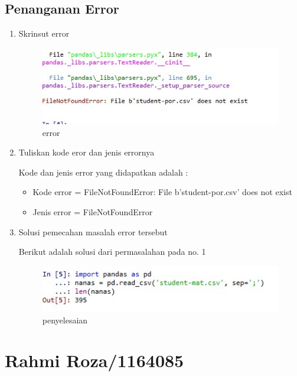 \subsection{Penanganan Error}
\begin{enumerate}
\item Skrinsut error
\begin{figure}
\centering
\includegraphics[scale=0.5]{figures/h1.jpg}
\caption{error}
\label{contoh}
\end{figure}

\item Tuliskan kode eror dan jenis errornya
\par Kode dan jenis error yang didapatkan adalah :
\begin{itemize}
\item Kode error = FileNotFoundError: File b'student-por.csv' does not exist
\item Jenis error = FileNotFoundError
\end{itemize}

\item Solusi pemecahan masalah error tersebut
\par Berikut adalah solusi dari permasalahan pada no. 1
\begin{figure}
\centering
\includegraphics[scale=0.5]{figures/g1.jpg}
\caption{penyelesaian}
\label{contoh}
\end{figure}

\end{enumerate}



\section{Rahmi Roza/1164085}

